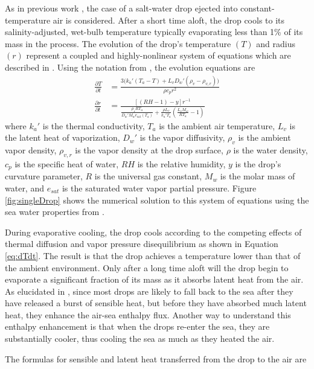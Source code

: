 \documentclass[10pt,a4paper]{article}
\begin{document}
As in previous work \citep{Andreas1990,Andreas2001}, the case of a salt-water drop ejected into constant-temperature air is considered. After a short time aloft, the drop cools to its salinity-adjusted, wet-bulb temperature typically evaporating less than 1\% of its mass in the process. The evolution of the drop's temperature $(T)$ and radius $(r)$ represent a coupled and highly-nonlinear system of equations which are described in \citet{Pruppacher1978}. Using the notation from \citet{Andreas2005}, the evolution equations are
\begin{align}
\frac{\partial T}{\partial t} &= \frac{3\Big(k_a'(T_a-T)+L_vD_w'(\rho_v-\rho_{v,r})\Big)}{\rho c_{p}r^2} \label{eq:dTdt}\\
\frac{\partial r}{\partial t} &= \frac{[(RH-1)-y]r^{-1}}{\frac{\rho_sRT_a}{D_w'M_we_{\text{sat}}(T_a)}+\frac{\rho L_v}{k_a'T_a}\left(\frac{L_vM_w}{RT_a}-1\right)}\label{eq:drdt}
\end{align}
where $k_a'$ is the thermal conductivity, $T_a$ is the ambient air temperature, $L_v$ is the latent heat of vaporization, $D_w'$ is the vapor diffusivity, $\rho_v$ is the ambient vapor density, $\rho_{v,r}$ is the vapor density at the drop surface, $\rho$ is the water density, $c_p$ is the specific heat of water, $RH$ is the relative humidity, $y$ is the drop's curvature parameter, $R$ is the universal gas constant, $M_w$ is the molar mass of water, and $e_{sat}$ is the saturated water vapor partial pressure.
Figure \ref{fig:singleDrop} shows the numerical solution to this system of equations using the sea water properties from \citet{Nayar2016}.\par 
During evaporative cooling, the drop cools according to the competing effects of thermal diffusion and vapor pressure disequilibrium as shown in Equation \ref{eq:dTdt}. The result is that the drop achieves a temperature lower than that of the ambient environment. Only after a long time aloft will the drop begin to evaporate a significant fraction of its mass as it absorbs latent heat from the air. As elucidated in \citet{Andreas2001}, since most drops are likely to fall back to the sea after they have released a burst of sensible heat, but before they have absorbed much latent heat, they enhance the air-sea enthalpy flux. Another way to understand this enthalpy enhancement is that when the drops re-enter the sea, they are substantially cooler, thus cooling the sea as much as they heated the air. \par 
The formulas for sensible and latent heat transferred from the drop to the air are
\end{document}

